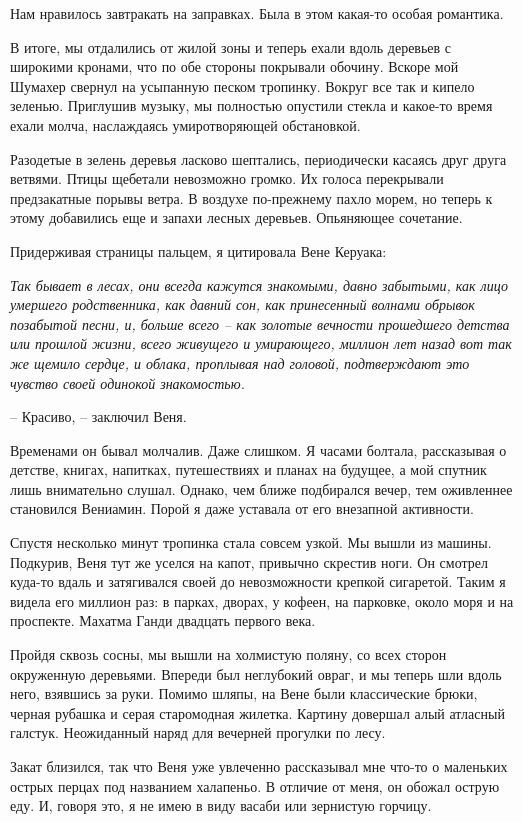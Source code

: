 \documentclass[
]{book}
\begin{document}
Нам нравилось завтракать на заправках. Была в этом какая-то особая романтика.

В итоге, мы отдалились от жилой зоны и теперь ехали вдоль деревьев с широкими кронами, что по обе стороны покрывали обочину. Вскоре мой Шумахер свернул на усыпанную песком тропинку. Вокруг все так и кипело зеленью. Приглушив музыку, мы полностью опустили стекла и какое-то время ехали молча, наслаждаясь умиротворяющей обстановкой.

Разодетые в зелень деревья ласково шептались, периодически касаясь друг друга ветвями. Птицы щебетали невозможно громко. Их голоса перекрывали предзакатные порывы ветра. В воздухе по-прежнему пахло морем, но теперь к этому добавились еще и запахи лесных деревьев. Опьяняющее сочетание.

Придерживая страницы пальцем, я цитировала Вене Керуака:

\emph{Так бывает в лесах, они всегда кажутся знакомыми, давно забытыми, как лицо умершего родственника, как давний сон, как принесенный волнами обрывок позабытой песни, и, больше всего -- как золотые вечности прошедшего детства или прошлой жизни, всего живущего и умирающего, миллион лет назад вот так же щемило сердце, и облака, проплывая над головой, подтверждают это чувство своей одинокой знакомостью.}

-- Красиво, -- заключил Веня.

Временами он бывал молчалив. Даже слишком. Я часами болтала, рассказывая о детстве, книгах, напитках, путешествиях и планах на будущее, а мой спутник лишь внимательно слушал. Однако, чем ближе подбирался вечер, тем оживленнее становился Вениамин. Порой я даже уставала от его внезапной активности.

Спустя несколько минут тропинка стала совсем узкой. Мы вышли из машины. Подкурив, Веня тут же уселся на капот, привычно скрестив ноги. Он смотрел куда-то вдаль и затягивался своей до невозможности крепкой сигаретой. Таким я видела его миллион раз: в парках, дворах, у кофеен, на парковке, около моря и на проспекте. Махатма Ганди двадцать первого века.

Пройдя сквозь сосны, мы вышли на холмистую поляну, со всех сторон окруженную деревьями. Впереди был неглубокий овраг, и мы теперь шли вдоль него, взявшись за руки. Помимо шляпы, на Вене были классические брюки, черная рубашка и серая старомодная жилетка. Картину довершал алый атласный галстук. Неожиданный наряд для вечерней прогулки по лесу.

Закат близился, так что Веня уже увлеченно рассказывал мне что-то о маленьких острых перцах под названием халапеньо. В отличие от меня, он обожал острую еду. И, говоря это, я не имею в виду васаби или зернистую горчицу.
\end{document}
